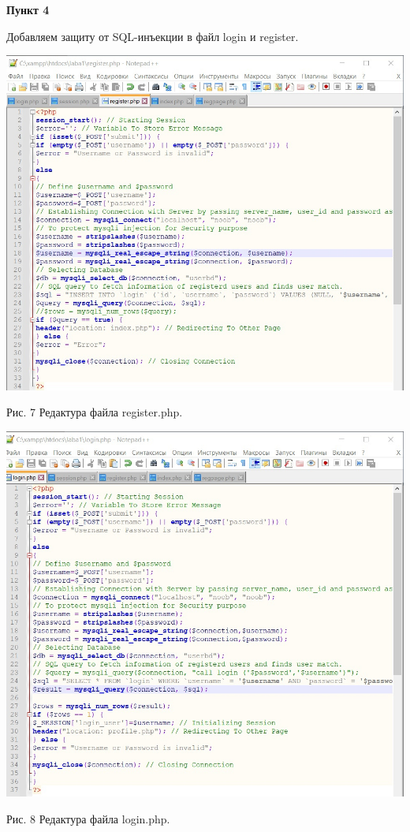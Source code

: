 \documentclass[a4paper,14pt]{extarticle}
\begin{document}
    \newpage
    \textbf{Пункт 4}
    \vspace{-3ex}
    \begin{center}
        \singlespacing
        Добавляем защиту от SQL-инъекции в файл login и register.

        \includegraphics[scale=0.4]{pics/7.jpg}

        Рис. 7 Редактура файла register.php.
        \vspace{1ex}

        \includegraphics[scale=0.4]{pics/8.jpg}

        Рис. 8 Редактура файла login.php.
    \end{center}
\end{document}
